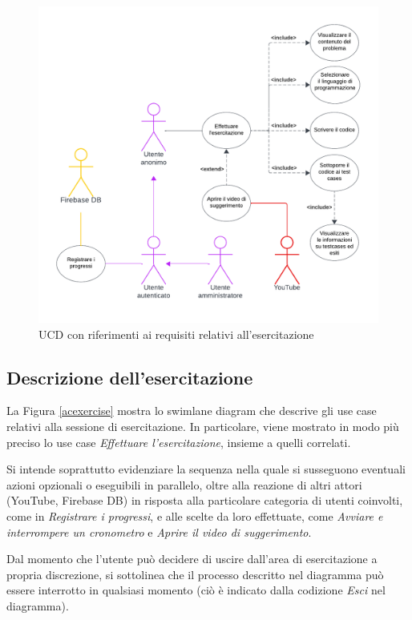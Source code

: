 \documentclass[11pt, a4paper]{article}
\theoremstyle{definition} %
\begin{document}
\begin{figure}[H]
\centering
\hspace*{-1.8cm}
\includegraphics[scale=0.9]{materiale/ucdiagrams/ucesercitazione.pdf}
\caption{UCD con riferimenti ai requisiti relativi all'esercitazione}
\label{esercitaz}
\end{figure}

\subsection*{Descrizione dell'esercitazione}
La Figura \ref{acexercise} mostra lo swimlane diagram che descrive gli
use case relativi alla sessione di esercitazione. In particolare,
viene mostrato in modo più preciso lo use case \textit{Effettuare
l'esercitazione}, insieme a quelli correlati.

Si intende soprattutto evidenziare la sequenza nella quale si
susseguono eventuali azioni opzionali o eseguibili in parallelo,
oltre alla reazione di altri attori (YouTube, Firebase DB) in
risposta alla particolare categoria di utenti coinvolti, come in
\textit{Registrare i progressi}, e alle scelte da loro effettuate,
come \textit{Avviare e interrompere un cronometro} e \textit{Aprire
il video di suggerimento}.

Dal momento che l'utente può decidere di uscire dall'area di esercitazione
a propria discrezione, si sottolinea che il processo descritto nel diagramma
può essere interrotto in qualsiasi momento (ciò è indicato dalla codizione
\textit{Esci} nel diagramma).
\end{document}
